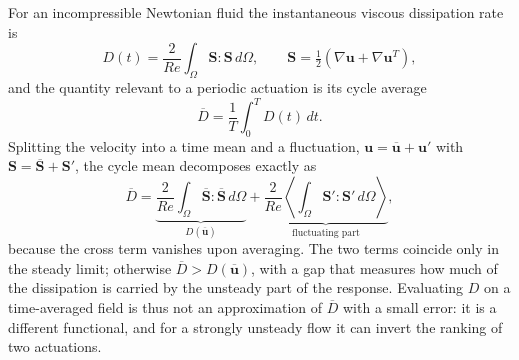 \documentclass[11pt,a4paper]{article}
\newcommand{\Dbar}{\overline{D}}
\newcommand{\Sij}{\mathbf{S}}
\newenvironment{chgdel}{\par\color{red}}{\par\color{black}}
\begin{document}
\begin{chgdel}
For an incompressible Newtonian fluid the instantaneous viscous dissipation rate is
\begin{equation}
D(t)=\frac{2}{Re}\int_\Omega \Sij:\Sij\,d\Omega,
\qquad
\Sij=\tfrac12\left(\nabla\mathbf{u}+\nabla\mathbf{u}^{T}\right),
\end{equation}
and the quantity relevant to a periodic actuation is its cycle average
\begin{equation}
\Dbar=\frac{1}{T}\int_0^T D(t)\,dt .
\end{equation}
Splitting the velocity into a time mean and a fluctuation,
$\mathbf{u}=\overline{\mathbf{u}}+\mathbf{u}'$ with
$\Sij=\overline{\Sij}+\Sij'$, the cycle mean decomposes exactly as
\begin{equation}
\Dbar
= \underbrace{\frac{2}{Re}\int_\Omega \overline{\Sij}:\overline{\Sij}\,d\Omega}
_{D(\overline{\mathbf{u}})}
+ \underbrace{\frac{2}{Re}\left\langle\int_\Omega \Sij':\Sij'\,d\Omega\right\rangle}_{\text{fluctuating part}},
\end{equation}
because the cross term vanishes upon averaging. The two terms coincide only in the
steady limit; otherwise $\Dbar>D(\overline{\mathbf{u}})$, with a gap that measures
how much of the dissipation is carried by the unsteady part of the response.
Evaluating $D$ on a time-averaged field is thus not an approximation of
$\Dbar$ with a small error: it is a different functional, and for a strongly
unsteady flow it can invert the ranking of two actuations.
\end{chgdel}
\end{document}
